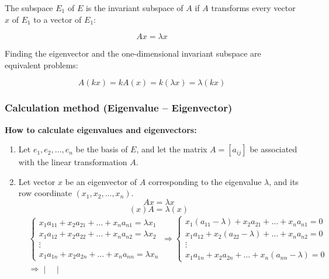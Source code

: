 The subspace $E_1$ of $E$ is the invariant subspace of $A$ if $A$ transforms every vector $x$ of $E_1$ to a vector of $E_1$:

\[
A x = \lambda x
\]

Finding the eigenvector and the one-dimensional invariant subspace are equivalent problems:

\[
A(k x) = k A(x) = k (\lambda x) = \lambda (k x)
\]

\subsubsection{Calculation method (Eigenvalue – Eigenvector)}

\textbf{How to calculate eigenvalues and eigenvectors:}
\begin{enumerate}
    \item Let $e_1, e_2, \dots, e_n$ be the basis of $E$, and let the matrix $A = [a_{ij}]$ be associated with the linear transformation $A$.
    \item Let vector $x$ be an eigenvector of $A$ corresponding to the eigenvalue $\lambda$, and its row coordinate $(x_1, x_2, \ldots, x_n)$.
    \begin{equation*}
        A x = \lambda x
    \end{equation*}
    \begin{equation*}
        (x)A = \lambda (x)
    \end{equation*}
    \begin{align*}
        &\begin{cases}
            x_1a_{11}+ x_2a_{21} + \ldots + x_n a_{n1} = \lambda x_1\\
            x_1a_{12}+ x_2a_{22} + \ldots + x_n a_{n2} = \lambda x_2\\
            \vdots\\
            x_1a_{1n}+ x_2a_{2n} + \ldots + x_n a_{nn} = \lambda x_n
        \end{cases}
        \Rightarrow \begin{cases}
            x_1(a_{11} - \lambda) + x_2a_{21} + \ldots + x_na_{n1} = 0\\
            x_1a_{12} + x_2(a_{22} - \lambda) + \ldots + x_na_{n2} = 0\\
            \vdots\\
            x_1a_{1n} + x_2a_{2n} + \ldots + x_n(a_{nn} - \lambda) = 0
        \end{cases}\\
        &\Rightarrow \begin{vmatrix}

\end{vmatrix}
\end{align*}
\end{enumerate}
